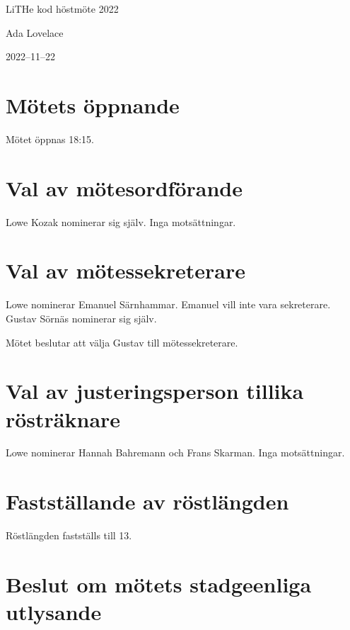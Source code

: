 \documentclass[a4paper]{article}
\begin{document}
\begin{center}
{\huge LiTHe kod höstmöte 2022}\par
\vspace{0.5em}
{\Large Ada Lovelace}\par
{\Large 2022\hspace{0.1em}--\hspace{0.1em}11\hspace{0.1em}--\hspace{0.1em}22}
\vspace{1.5em}
\end{center}

\section{Mötets öppnande}

Mötet öppnas 18:15.

\section{Val av mötesordförande}

Lowe Kozak nominerar sig själv. Inga motsättningar.

\section{Val av mötessekreterare}

Lowe nominerar Emanuel Särnhammar. Emanuel vill inte vara sekreterare. Gustav
Sörnäs nominerar sig själv.

Mötet beslutar att välja Gustav till mötessekreterare.

\section{Val av justeringsperson tillika rösträknare}

Lowe nominerar Hannah Bahremann och Frans Skarman. Inga motsättningar.

\section{Fastställande av röstlängden}

Röstlängden fastställs till 13.

\section{Beslut om mötets stadgeenliga utlysande}
\end{document}
